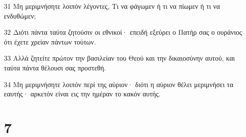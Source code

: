 \par 31 Μη μεριμνήσητε λοιπόν λέγοντες, Τι να φάγωμεν ή τι να πίωμεν ή τι να ενδυθώμεν;
\par 32 Διότι πάντα ταύτα ζητούσιν οι εθνικοί· επειδή εξεύρει ο Πατήρ σας ο ουράνιος ότι έχετε χρείαν πάντων τούτων.
\par 33 Αλλά ζητείτε πρώτον την βασιλείαν του Θεού και την δικαιοσύνην αυτού, και ταύτα πάντα θέλουσι σας προστεθή.
\par 34 Μη μεριμνήσητε λοιπόν περί της αύριον· διότι η αύριον θέλει μεριμνήσει τα εαυτής· αρκετόν είναι εις την ημέραν το κακόν αυτής.

\chapter{7}


